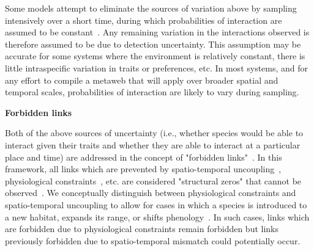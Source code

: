 \documentclass[12pt]{article}
\begin{document}
\begin{spacing}{2.0}
          Some models attempt to eliminate the sources of variation above by sampling intensively over a short time, during which probabilities of interaction are assumed to be constant~\citep{Bartomeus2013,Weinstein2017,Weinstein2017a}. Any remaining variation in the interactions observed is therefore assumed to be due to detection uncertainty. This assumption may be accurate for some systems where the environment is relatively constant, there is little intraspecific variation in traits or preferences, etc. In most systems, and for any effort to compile a metaweb that will apply over broader spatial and temporal scales, probabilities of interaction are likely to vary during sampling.


          \textbf{Forbidden links}

            Both of the above sources of uncertainty (i.e., whether species would be able to interact given their traits and whether they are able to interact at a particular place and time) are addressed in the concept of "forbidden links"~\citep{Jordano2016}. In this framework, all links which are prevented by spatio-temporal uncoupling~\citep{Jordano1987}, physiological constraints~\citep{Jordano1987,More2012}, etc. are considered "structural zeros" that cannot be observed~\citep{Jordano2016}. We conceptually distinguish between physiological constraints and spatio-temporal uncoupling to allow for cases in which a species is introduced to a new habitat, expands its range, or shifts phenology~\citep{Gravel2013}. In such cases, links which are forbidden due to physiological constraints remain forbidden but links previously forbidden due to spatio-temporal mismatch could potentially occur. 



\end{spacing}
\end{document}
